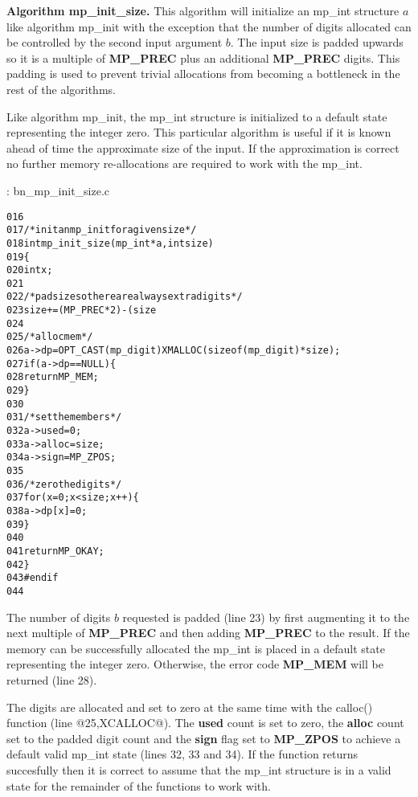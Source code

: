 \documentclass[b5paper]{book}
\begin{document}
\textbf{Algorithm mp\_init\_size.}
This algorithm will initialize an mp\_int structure $a$ like algorithm mp\_init with the exception that the number of 
digits allocated can be controlled by the second input argument $b$.  The input size is padded upwards so it is a 
multiple of \textbf{MP\_PREC} plus an additional \textbf{MP\_PREC} digits.  This padding is used to prevent trivial 
allocations from becoming a bottleneck in the rest of the algorithms.

Like algorithm mp\_init, the mp\_int structure is initialized to a default state representing the integer zero.  This 
particular algorithm is useful if it is known ahead of time the approximate size of the input.  If the approximation is
correct no further memory re-allocations are required to work with the mp\_int.

\vspace{+3mm}\begin{small}
\hspace{-5.1mm}{\bf File}: bn\_mp\_init\_size.c
\vspace{-3mm}
\begin{alltt}
016   
017   /* init an mp_init for a given size */
018   int mp_init_size (mp_int * a, int size)
019   \{
020     int x;
021   
022     /* pad size so there are always extra digits */
023     size += (MP_PREC * 2) - (size % MP_PREC);    
024     
025     /* alloc mem */
026     a->dp = OPT_CAST(mp_digit) XMALLOC (sizeof (mp_digit) * size);
027     if (a->dp == NULL) \{
028       return MP_MEM;
029     \}
030   
031     /* set the members */
032     a->used  = 0;
033     a->alloc = size;
034     a->sign  = MP_ZPOS;
035   
036     /* zero the digits */
037     for (x = 0; x < size; x++) \{
038         a->dp[x] = 0;
039     \}
040   
041     return MP_OKAY;
042   \}
043   #endif
044   
\end{alltt}
\end{small}

The number of digits $b$ requested is padded (line 23) by first augmenting it to the next multiple of 
\textbf{MP\_PREC} and then adding \textbf{MP\_PREC} to the result.  If the memory can be successfully allocated the 
mp\_int is placed in a default state representing the integer zero.  Otherwise, the error code \textbf{MP\_MEM} will be 
returned (line 28).  

The digits are allocated and set to zero at the same time with the calloc() function (line @25,XCALLOC@).  The 
\textbf{used} count is set to zero, the \textbf{alloc} count set to the padded digit count and the \textbf{sign} flag set 
to \textbf{MP\_ZPOS} to achieve a default valid mp\_int state (lines 32, 33 and 34).  If the function 
returns succesfully then it is correct to assume that the mp\_int structure is in a valid state for the remainder of the 
functions to work with.
\end{document}
